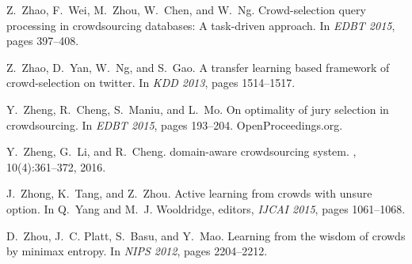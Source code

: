 \documentclass[11pt]{article}
\begin{document}
\begin{thebibliography}{10}
	Z.~Zhao, F.~Wei, M.~Zhou, W.~Chen, and W.~Ng.
	\newblock Crowd-selection query processing in crowdsourcing databases: {A}
	task-driven approach.
	\newblock In {\em {EDBT} 2015}, pages 397--408.
	
	Z.~Zhao, D.~Yan, W.~Ng, and S.~Gao.
	\newblock A transfer learning based framework of crowd-selection on twitter.
	\newblock In {\em {KDD} 2013}, pages 1514--1517.
	
	Y.~Zheng, R.~Cheng, S.~Maniu, and L.~Mo.
	\newblock On optimality of jury selection in crowdsourcing.
	\newblock In {\em {EDBT} 2015}, pages 193--204. OpenProceedings.org.
	
	Y.~Zheng, G.~Li, and R.~Cheng.
	 domain-aware crowdsourcing system.
	, 10(4):361--372, 2016.
	
	J.~Zhong, K.~Tang, and Z.~Zhou.
	\newblock Active learning from crowds with unsure option.
	\newblock In Q.~Yang and M.~J. Wooldridge, editors, {\em {IJCAI} 2015}, pages
	1061--1068.
	
	D.~Zhou, J.~C. Platt, S.~Basu, and Y.~Mao.
	\newblock Learning from the wisdom of crowds by minimax entropy.
	\newblock In {\em NIPS 2012}, pages 2204--2212.
	
\end{thebibliography}
\end{document}
